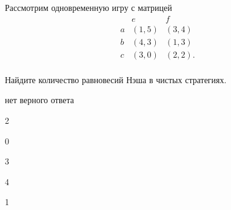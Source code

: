 
\begin{question}
Рассмотрим одновременную игру с матрицей \[
\begin{matrix}
   & e & f \\
a  & (1, 5) & (3, 4) \\
b  & (4, 3) & (1, 3) \\
c  & (3, 0)          & (2, 2). \\
\end{matrix}
\]

Найдите количество равновесий Нэша в чистых стратегиях.
\begin{answerlist}
  \item нет верного ответа
  \item 2
  \item 0
  \item 3
  \item 4
  \item 1
\end{answerlist}
\end{question}


